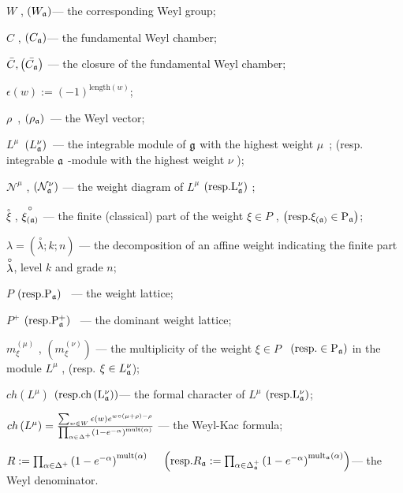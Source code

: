 \documentclass[12pt]{article}
\theoremstyle{definition}
\begin{document}
$W$ , $\left( W_{\frak{a}}\right) $--- the corresponding Weyl group;

$C$ , $\left( C_{\frak{a}}\right) $--- the fundamental Weyl chamber;

$\bar{C}, \left(\bar{C_{\frak{a}}}\right)$ --- the closure of the
fundamental Weyl chamber;

$\epsilon \left( w\right) :=\left( -1\right) ^{\mathrm{length}(w)}$;

$\rho $\ , $\left( \rho _{\frak{a}}\right) $\ --- the Weyl vector;

$L^{\mu }$\ $\left( L_{\frak{a}}^{\nu }\right) $\ --- the integrable module
of $\frak{g}$ with the highest weight $\mu $\ ; (resp. integrable $\frak{a}$
-module with the highest weight $\nu $ );

$\mathcal{N}^{\mu }$ , $\left( \mathcal{N}_{\frak{a}}^{\nu }\right) $ ---
the weight diagram of $L^{\mu }$ $\left( \mathrm{{resp.}L_{\frak{a}}^{\nu }}%
\right) $ ;

$\stackrel{\circ }{\xi }$ , $\stackrel{\circ }{\xi _{\left( \frak{a}\right) }%
}$ --- the finite (classical) part of the weight $\xi \in P$ , $\left(
\mathrm{{resp.}\xi _{\left( \frak{a}\right) }\in P_{\frak{a}}}\right) $;

$\lambda =\left( \stackrel{\circ }{\lambda };k;n\right) $ --- the
decomposition of an affine weight indicating the finite part $\stackrel{%
\circ }{\lambda }$, level $k$ and grade $n$;

$P$ $\left( \mathrm{{resp.}P_{\frak{a}}}\right) $ \ --- the weight lattice;

$P^{+}$ $\left( \mathrm{{resp.}P_{\frak{a}}^{+}}\right) $ \ --- the dominant
weight lattice;

$m_{\xi }^{\left( \mu \right) }$ , $\left( m_{\xi }^{\left( \nu \right)
}\right) $ --- the multiplicity of the weight $\xi \in P$ \ $\left( \mathrm{{%
resp. }\in P_{\frak{a}}}\right) $ in the module $L^{\mu }$ , (resp. $\xi \in
L_{\frak{a}}^{\nu } $);

$ch\left( L^{\mu }\right) $ $\left( \mathrm{{resp. }ch\left( L_{\frak{a}%
}^{\nu }\right) }\right) $--- the formal character of $L^{\mu }$ $\left( 
\mathrm{{resp. }L_{\frak{a}}^{\nu }}\right) $;

$ch\left( L^{\mu }\right) =\frac{\sum_{w\in W}\epsilon (w)e^{w\circ (\mu
+\rho )-\rho }}{\prod_{\alpha \in \Delta ^{+}}\left( 1-e^{-\alpha }\right) ^{%
\mathrm{{mult}\left( \alpha \right) }}}$ --- the Weyl-Kac formula;

$R:=\prod_{\alpha \in \Delta ^{+}}\left( 1-e^{-\alpha }\right) ^{\mathrm{{%
mult}\left( \alpha \right) }}\quad $ $\left( \mathrm{resp.}R_{\frak{a}%
}:=\prod_{\alpha \in \Delta _{\frak{a}}^{+}}\left( 1-e^{-\alpha }\right) ^{%
\mathrm{mult}_{\frak{a}}\mathrm{\left( \alpha \right) }}\right) $--- the
Weyl denominator.
\end{document}
